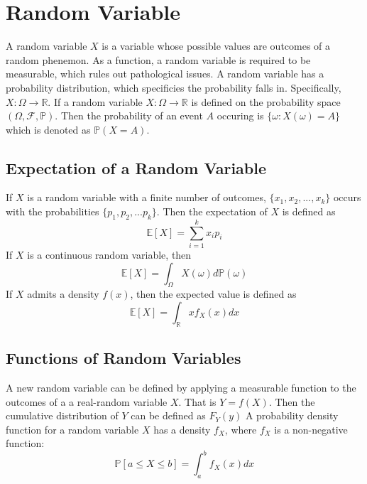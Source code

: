 \section{Random Variable}
A random variable $X$ is a variable whose possible values are outcomes of a random phenemon.  As a function, a random variable is required to be measurable, which rules out pathological issues.  A random variable has a probability distribution, which specificies the probability falls in.  Specifically, $X:\Omega\rightarrow\mathbb{R}$.  If a random variable $X:\Omega \rightarrow \mathbb{R}$ is defined on the probability space $(\Omega,\mathcal{F},\mathbb{P})$.  Then the probability of an event $A$ occuring is $\{\omega:X(\omega)=A\}$ which is denoted as $\mathbb{P}(X=A)$.

\subsection{Expectation of a Random Variable}

If $X$ is a random variable with a finite number of outcomes, $\{x_1,x_2,...,x_k\}$ occurs with the probabilities $\{p_1,p_2,...p_k\}$.  Then the expectation of $X$ is defined as
\begin{equation}
  \mathbb{E}[X]=\sum_{i=1}^{k}x_i p_i
\end{equation}
If $X$ is a continuous random variable, then
\begin{equation}
  \mathbb{E}[X]=\int_{\Omega} X(\omega) d\mathbb{P}(\omega)
\end{equation}
If $X$ admits a density $f(x)$, then the expected value is defined as
\begin{equation}
  \mathbb{E}[X]=\int_{\mathbb{R}}x f_{X}(x) dx
\end{equation}

\subsection{Functions of Random Variables}
A new random variable can be defined by applying a measurable function to the outcomes of a a real-random variable $X$.  That is $Y=f(X)$.  Then the cumulative distribution of $Y$ can be defined as $F_Y(y)$
A probability density function for a random variable $X$ has a density $f_X$, where $f_X$ is a non-negative function:
\begin{equation}
  \mathbb{P}[a \leq X \leq b]=\int_{a}^{b}f_{X}(x)dx
\end{equation}

